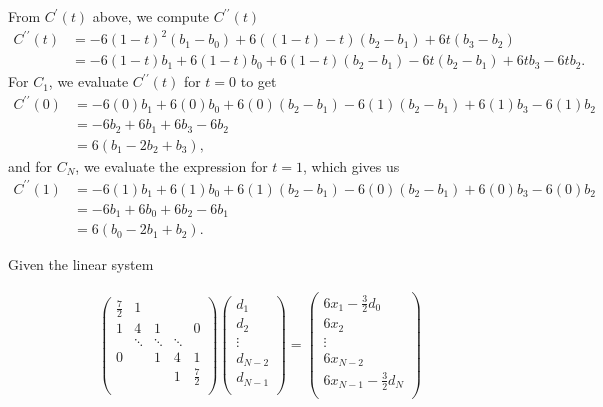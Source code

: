 \documentclass[paper=a4, fontsize=11pt]{scrartcl} %
\begin{document}
From $C^\prime(t)$ above, we compute $C^{\prime\prime}(t)$
\begin{align*}
    C^{\prime\prime}(t) &=
    -6(1-t)^2(b_1 - b_0) + 6((1-t) - t)(b_2 - b_1) + 6t(b_3 - b_2) \\
    &=
    - 6(1-t)b_1 + 6(1-t)b_0 + 6(1-t)(b_2 - b_1) - 6t(b_2 - b_1) +         6tb_3 - 6tb_2.
\end{align*}
For $C_1$, we evaluate $C^{\prime\prime}(t)$ for $t=0$ to get
\begin{align*}
    C^{\prime\prime}(0) &=
    - 6(0)b_1 + 6(0)b_0 + 6(0)(b_2 - b_1) - 6(1)(b_2 - b_1) +             6(1)b_3 - 6(1)b_2 \\
    &=
    -6b_2 + 6 b_1 + 6b_3 - 6b_2 \\
    &=
    6(b_1 - 2b_2 + b_3),
\end{align*}
and for $C_N$, we evaluate the expression for $t=1$, which gives us
\begin{align*}
    C^{\prime\prime}(1) &=
    - 6(1)b_1 + 6(1)b_0 + 6(1)(b_2 - b_1) - 6(0)(b_2 - b_1) +             6(0)b_3 - 6(0)b_2 \\
    &=
    -6b_1 + 6 b_0 + 6b_2 - 6b_1 \\
    &=
    6(b_0 - 2b_1 + b_2).
\end{align*}

Given the linear system

\begin{align*}
    \begin{pmatrix}
        \frac{7}{2} & 1 \\
        1 & 4 & 1 & & 0\\
          & \ddots & \ddots & \ddots \\
        0 & & 1 & 4 & 1\\
          & &   & 1 & \frac{7}{2}\\
    \end{pmatrix} \begin{pmatrix}
        d_{1}\\
        d_{2}\\
        \vdots\\
        d_{N-2}\\
        d_{N-1}\\
    \end{pmatrix} = \begin{pmatrix}
        6x_{1} - \frac{3}{2}d_{0}\\
        6x_{2}\\
        \vdots\\
        6x_{N-2}\\
        6x_{N-1} - \frac{3}{2}d_{N}\\
    \end{pmatrix}
\end{align*}
\end{document}
